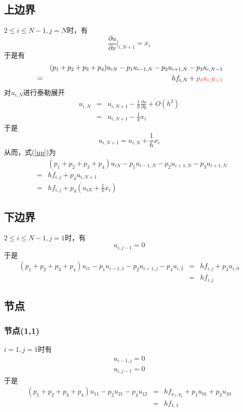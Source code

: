 \documentclass[a4paper,left=2.5cm,right=2.5cm]{article}
\begin{document}
\begin{spacing}{1.6}
	\subsection{上边界}
	$2\le i \le N-1,j=N$时，有
	\begin{equation}
	\frac{\partial u}{\partial x}\big|_{i,N+1} = x_i
	\end{equation}
	于是有
	\begin{eqnarray}
	&&(p_1+p_2+p_3+p_4)u_{iN} -p_1u_{i-1,N}-p_2u_{i+1,N}-p_3u_{i,N-1} \\
	&=&hf_{i,N}+{\color{red}p_4u_{i,N+1}}\label{up}
	\end{eqnarray}
	对$u_{i,N}$进行泰勒展开
	\begin{eqnarray}
	u_{i,N} &=& u_{i,N+1} - \frac{1}{h}\frac{\partial u}{\partial y} + O(h^2) \\
	&=&u_{i,N+1} - \frac{1}{h}x_{i}
	\end{eqnarray}
	于是
	\begin{equation}
	u_{i,N+1} = u_{i,N} + \frac{1}{h}x_{i} \label{taylorup}
	\end{equation}
	从而，式(\ref{up})为
	\begin{eqnarray}
	&&(p_1+p_2+p_3+p_4)u_{iN} - p_1u_{i-1,N} -p_2u_{i+1,N}- p_3u_{i+1,N}  \\ 
	&=&hf_{i,j}+p_4u_{i,N+1}\\
	&=&hf_{i,j}+p_4(u_{iN} + \frac{1}{h}x_{i})
	\end{eqnarray}
	\subsection{下边界}
	$2\le i \le N-1,j=1$时，有
	\begin{equation}
	u_{i,j-1}=0
	\end{equation}
	于是
	\begin{eqnarray}
	(p_1+p_2+p_3+p_4)u_{i1}-p_1u_{i-1,1}-p_2u_{i+1,j}-p_4u_{i,2}&=&hf_{i,j}+p_3u_{i,0}\\
	&=&hf_{i,j} 
	\end{eqnarray}
	\subsection{节点}
	\subsubsection{节点(1,1)}
	$i=1,j=1$时有
	\begin{eqnarray}
	u_{i-1,j} = 0\\
	u_{i,j-1} = 0
	\end{eqnarray}
	于是
	\begin{eqnarray}
	(p_1+p_2+p_3+p_4)u_{11} - p_2u_{21} - p_4u_{12} &=&hf_{x_1,y_1} + p_1u_{01} + p_3u_{10}\\
	&=&hf_{1,1}
	\end{eqnarray}

\end{spacing}
\end{document}
